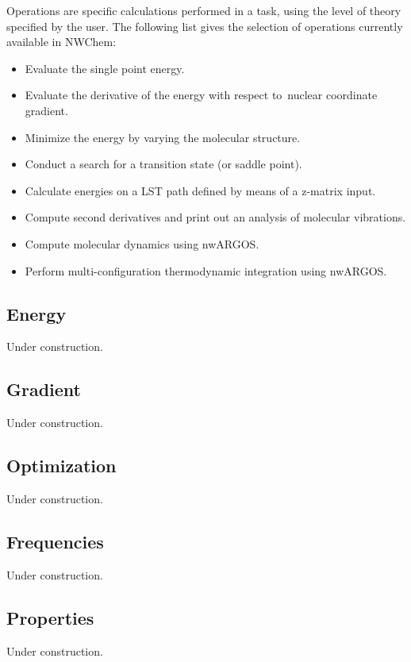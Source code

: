Operations are specific calculations performed in a task, using the level of
theory specified by the user.  
The following list gives the selection of operations currently
available in NWChem:
\begin{itemize}
\item Evaluate the single point energy.
\item Evaluate the derivative of the energy with respect to\
   nuclear coordinate gradient.
\item Minimize the energy by varying the molecular
   structure.
\item Conduct a search for a transition state (or saddle point). 
\item Calculate energies on a LST path defined by means of
a z-matrix input.
\item Compute second derivatives 
and print out an analysis of molecular vibrations.
\item Compute molecular dynamics using nwARGOS.
\item Perform multi-configuration
  thermodynamic integration using nwARGOS.
\end{itemize}


\subsection{Energy}

Under construction.

\subsection{Gradient}

Under construction.

\subsection{Optimization}

Under construction.

\subsection{Frequencies}

Under construction.

\subsection{Properties}

Under construction.

